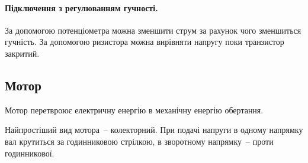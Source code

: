 \documentclass[12pt,a4paper]{report}  %
\begin{document}
\paragraph{Підключення з регулюванням гучності.} 

За допомогою потенціометра можна зменшити струм за рахунок чого зменшиться гучність.
За допомогою ризистора можна вирівняти напругу поки транзистор закритий.

\begin{figure}[h!]
\label{ris:image}
\end{figure}

\subsection{Мотор}

Мотор перетвроює електричну енергію в механічну енергію обертання.

\begin{figure}[h!]
\label{ris:image}
\end{figure}


Найпростіший вид мотора~-- колекторний. При подачі напруги в одному напрямку вал крутиться за годинниковою стрілкою, в зворотному напрямку~-- проти годинникової.
\end{document}
